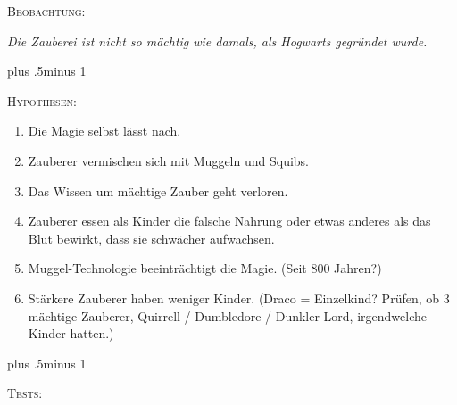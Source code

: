 \begin{centering}
\nopagebreak
\scshape Beobachtung:

\itshape Die Zauberei ist nicht so mächtig wie damals, als Hogwarts gegründet wurde.

\baselineskip plus .5\textheight minus 1\baselineskip

\scshape Hypothesen:

\nopagebreak
\itshape
 \begin{enumerate}[1.]
 \firmlist
 \setlength{\leftmargin}{\parindent}
 \setlength{\rightmargin}{\parindent}
 \item Die Magie selbst lässt nach.
 \item Zauberer vermischen sich mit Muggeln und Squibs.
 \item Das Wissen um mächtige Zauber geht verloren.
 \item Zauberer essen als Kinder die falsche Nahrung oder etwas anderes als das Blut bewirkt, dass sie schwächer aufwachsen.
 \item Muggel-Technologie beeinträchtigt die Magie. (Seit 800 Jahren?)
 \item Stärkere Zauberer haben weniger Kinder. (Draco = Einzelkind? Prüfen, ob 3 mächtige Zauberer, Quirrell / Dumbledore / Dunkler Lord, irgendwelche Kinder hatten.)
 \end{enumerate}

\baselineskip plus .5\textheight minus 1\baselineskip

\scshape Tests:


\end{centering}

